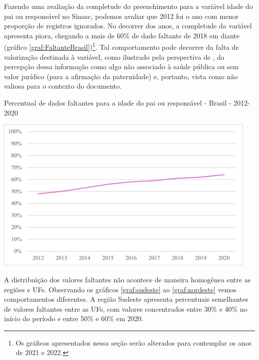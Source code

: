 Fazendo uma avaliação da completude do preenchimento para a variável idade do pai ou responsável no Sinasc, podemos avaliar que 2012 foi o ano com menor proporção de registros ignorados. No decorrer dos anos, a completude da variável apresenta piora, chegando a mais de 60\% de dado faltante de 2018 em diante (gráfico \ref{graf:FaltanteBrasil})\footnote{Os gráficos apresentados nessa seção serão alterados para contemplar os anos de 2021 e 2022.}. Tal comportamento pode decorrer da falta de valorização destinada à variável, como ilustrado pela perspectiva de , da percepção dessa informação como algo não associado à saúde pública ou sem valor jurídico (para a afirmação da paternidade) e, portanto, vista como não valiosa para o contexto do documento. 

\begin{grafico}
    \centering
    \caption{Percentual de dados faltantes para a idade do pai ou responsável - Brasil - 2012-2020}
    \includegraphics[width=5.0in]{imagens/Proporção de dados faltantes para idade do pai 2010-2020 nível Brasil.pdf}
    \label{graf:FaltanteBrasil}
\end{grafico}

A distribuição dos valores faltantes não acontece de maneira homogênea entre as regiões e UFs. Observando os gráficos \ref{graf:sudeste} ao \ref{graf:nordeste} vemos comportamentos diferentes. A região Sudeste apresenta percentuais semelhantes de valores faltantes entre as UFs, com valores concentrados entre 30\% e 40\% no início do período e entre 50\% e 60\% em 2020.

